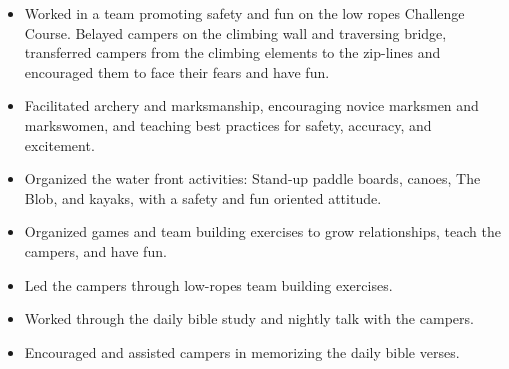 \documentclass[letterpaper,10pt]{article}
\begin{document}
    \begin{itemize}
        \tightlist{}
        \item
        Worked in a team promoting safety and fun on the low ropes Challenge Course.
        Belayed campers on the climbing wall and traversing bridge, transferred campers from the climbing elements to the zip-lines and encouraged them to face their fears and have fun.
        \item
        Facilitated archery and marksmanship, encouraging novice marksmen and markswomen, and teaching best practices for safety, accuracy, and excitement.
        \item
        Organized the water front activities: Stand-up paddle boards, canoes, The Blob, and kayaks, with a safety and fun oriented attitude.
        \item
        Organized games and team building exercises to grow relationships, teach the campers, and have fun.
        \item
        Led the campers through low-ropes team building exercises.
        \item
        Worked through the daily bible study and nightly talk with the campers.
        \item
        Encouraged and assisted campers in memorizing the daily bible verses.
    \end{itemize}
\end{document}
